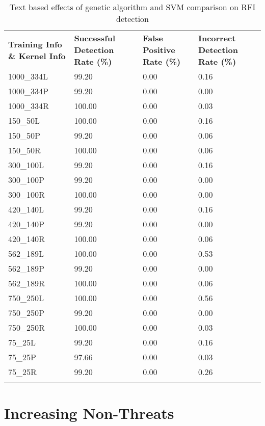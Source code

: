 \begin{appendices}
\begin{longtable}{|p{1.5in}|p{1in}|p{1in}|p{1in}|}
	\hline
	\textbf{Training Info \& Kernel Info} & \textbf{Successful Detection Rate (\%)} & \textbf{False Positive Rate (\%)} & \textbf{Incorrect Detection Rate (\%)}  \\
	\hhline{|=|=|=|=|}
	1000\_334L &  99.20 & 0.00 & 0.16 \\ \hline
	1000\_334P &  99.20 & 0.00 & 0.00 \\ \hline
	1000\_334R & 100.00 & 0.00 & 0.03 \\ \hline
	150\_50L & 100.00 & 0.00 & 0.16 \\ \hline
	150\_50P &  99.20 & 0.00 & 0.06 \\ \hline
	150\_50R & 100.00 & 0.00 & 0.06 \\ \hline
	300\_100L &  99.20 & 0.00 & 0.16 \\ \hline
	300\_100P &  99.20 & 0.00 & 0.00 \\ \hline
	300\_100R & 100.00 & 0.00 & 0.00 \\ \hline
	420\_140L &  99.20 & 0.00 & 0.16 \\ \hline
	420\_140P &  99.20 & 0.00 & 0.00 \\ \hline
	420\_140R & 100.00 & 0.00 & 0.06 \\ \hline
	562\_189L & 100.00 & 0.00 & 0.53 \\ \hline
	562\_189P &  99.20 & 0.00 & 0.00 \\ \hline
	562\_189R & 100.00 & 0.00 & 0.06 \\ \hline
	750\_250L & 100.00 & 0.00 & 0.56 \\ \hline
	750\_250P &  99.20 & 0.00 & 0.00 \\ \hline
	750\_250R & 100.00 & 0.00 & 0.03 \\ \hline
	75\_25L &  99.20 & 0.00 & 0.16 \\ \hline
	75\_25P &  97.66 & 0.00 & 0.03 \\ \hline
	75\_25R &  99.20 & 0.00 & 0.26 \\ \hline
	\caption[]{Text based effects of genetic algorithm and SVM comparison on RFI detection}
	\label{app:rfiComparisonText}
\end{longtable}

\newpage
\section{Increasing Non-Threats}


\end{appendices}
